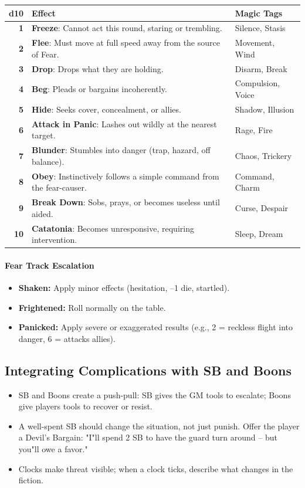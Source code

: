 \begin{center}
\begin{longtable}{>{\bfseries}r l l}
\toprule
d10 & Effect & Magic Tags \\
\midrule
1 & \textbf{Freeze}: Cannot act this round, staring or trembling. & Silence, Stasis \\
2 & \textbf{Flee}: Must move at full speed away from the source of Fear. & Movement, Wind \\
3 & \textbf{Drop}: Drops what they are holding. & Disarm, Break \\
4 & \textbf{Beg}: Pleads or bargains incoherently. & Compulsion, Voice \\
5 & \textbf{Hide}: Seeks cover, concealment, or allies. & Shadow, Illusion \\
6 & \textbf{Attack in Panic}: Lashes out wildly at the nearest target. & Rage, Fire \\
7 & \textbf{Blunder}: Stumbles into danger (trap, hazard, off balance). & Chaos, Trickery \\
8 & \textbf{Obey}: Instinctively follows a simple command from the fear-causer. & Command, Charm \\
9 & \textbf{Break Down}: Sobs, prays, or becomes useless until aided. & Curse, Despair \\
10 & \textbf{Catatonia}: Becomes unresponsive, requiring intervention. & Sleep, Dream \\
\bottomrule
\end{longtable}
\end{center}

\paragraph{Fear Track Escalation}
\begin{itemize}
  \item \textbf{Shaken:} Apply minor effects (hesitation, --1 die, startled).
  \item \textbf{Frightened:} Roll normally on the table.
  \item \textbf{Panicked:} Apply severe or exaggerated results (e.g., 2 = reckless flight into danger, 6 = attacks allies).
\end{itemize}

\subsection{Integrating Complications with SB and Boons}
\begin{itemize}
  \item SB and Boons create a push-pull: SB gives the GM tools to escalate; Boons give players tools to recover or resist.
  \item A well-spent SB should change the situation, not just punish. Offer the player a Devil's Bargain: "I"ll spend 2 SB to have the guard turn around -- but you"ll owe a favor."
  \item Clocks make threat visible; when a clock ticks, describe what changes in the fiction.
\end{itemize}

